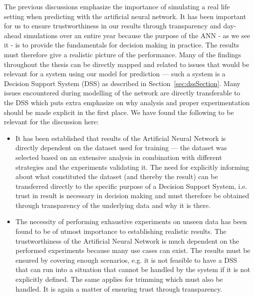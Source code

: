 The previous discussions emphasize the importance of simulating a real life setting when predicting with the artificial neural network. It has been important for us to ensure trustworthiness in our results through transparency and day-ahead simulations over an entire year because the purpose of the ANN - as we see it - is to provide the fundamentals for decision making in practice. The results must therefore give a realistic picture of the performance. Many of the findings throughout the thesis can be directly mapped and related to issues that would be relevant for a system using our model for prediction --- such a system is a Decision Support System (DSS) as described in Section~\ref{sec:dssSection}. Many issues encountered during modelling of the network are directly transferable to the DSS which puts extra emphasize on why analysis and proper experimentation should be made explicit in the first place. We have found the following to be relevant for the discussion here:

\begin{itemize}
\item It has been established that results of the Artificial Neural Network is directly dependent on the dataset used for training --- the dataset was selected based on an extensive analysis in combination with different strategies and the experiments validating it. The need for explicitly informing about what constituted the dataset (and thereby the result) can be transferred directly to the specific purpose of a Decision Support System, i.e. trust in result is necessary in decision making and must therefore be obtained through transparency of the underlying data and why it is there. 
\item The necessity of performing exhaustive experiments on unseen data has been found to be of utmost importance to establishing realistic results. The trustworthiness of the Artificial Neural Network is much dependent on the performed experiments because many use cases can exist. The results must be ensured by covering enough scenarios, e.g. it is not feasible to have a DSS that can run into a situation that cannot be handled by the system if it is not explicitly defined. The same applies for trimming which must also be handled. It is again a matter of ensuring trust through transparency.
\end{itemize}

